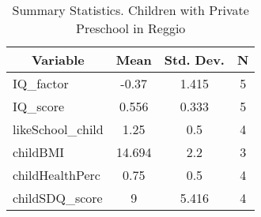 
\begin{table}[htbp]\centering \caption{Summary Statistics. Children with Private Preschool in Reggio \label{bothChildmaternaPrivReggio}}
\begin{tabular}{l c c  c}\hline\hline
\multicolumn{1}{c}{\textbf{Variable}} & \textbf{Mean}
 & \textbf{Std. Dev.} & \textbf{N}\\ \hline
IQ\_factor & -0.37 & 1.415  & 5\\
IQ\_score & 0.556 & 0.333  & 5\\
likeSchool\_child & 1.25 & 0.5  & 4\\
childBMI & 14.694 & 2.2  & 3\\
childHealthPerc & 0.75 & 0.5  & 4\\
childSDQ\_score & 9 & 5.416  & 4\\
\hline\end{tabular}
\end{table}
